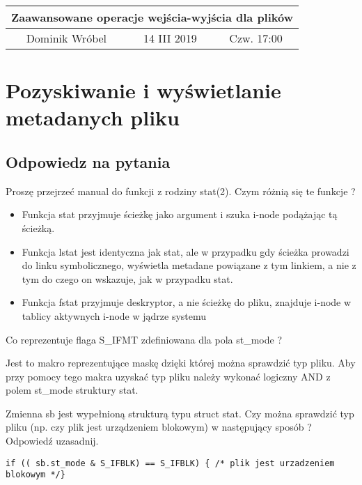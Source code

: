\documentclass[a4paper,15pt]{article}
\newcommand{\ask}[2]{
    \begin{tcolorbox}[colback=black!5!white,colframe=gray,title={Pytanie #1}]
        #2
    \end{tcolorbox}
}
\begin{document}
\begin{table}
\begin{center}
\begin{tabular}{|c|c|c|}
\hline
\multicolumn{3}{|c|}{\textbf{Zaawansowane operacje wejścia-wyjścia dla plików}} \\ \hline Dominik Wróbel & 14 III 2019 & Czw. 17:00 \\ \hline

\end{tabular}
\end{center}
\end{table}

\tableofcontents

\newpage
\section{Pozyskiwanie i wyświetlanie metadanych pliku}
\subsection{Odpowiedz na pytania}

\ask{}{Proszę przejrzeć manual do funkcji z rodziny stat(2). Czym różnią się te funkcje ?}

\begin{itemize}
\item  Funkcja stat przyjmuje ścieżkę jako argument i szuka i-node podążając tą ścieżką. 
\item Funkcja lstat jest identyczna jak stat, ale w przypadku gdy ścieżka prowadzi do linku symbolicznego, wyświetla metadane powiązane z tym linkiem, a nie z tym do czego on wskazuje, jak w przypadku stat.
\item  Funkcja fstat przyjmuje deskryptor, a nie ścieżkę do pliku, znajduje i-node w tablicy aktywnych i-node w jądrze systemu
\end{itemize}

\ask{}{
Co reprezentuje flaga S\_IFMT zdefiniowana dla pola st\_mode ? 
}

Jest to makro reprezentujące maskę dzięki której można sprawdzić typ pliku. Aby przy pomocy tego makra uzyskać typ pliku należy wykonać logiczny AND z polem st\_mode struktury stat. 



\ask{}{
Zmienna sb jest wypełnioną strukturą typu struct stat. Czy można sprawdzić typ pliku (np. czy plik jest urządzeniem blokowym) w następujący sposób ?
Odpowiedź uzasadnij.
}
\begin{lstlisting}[style=CStyle, label=some-code]
if (( sb.st_mode & S_IFBLK) == S_IFBLK) { /* plik jest urzadzeniem blokowym */}
\end{lstlisting}
\end{document}
